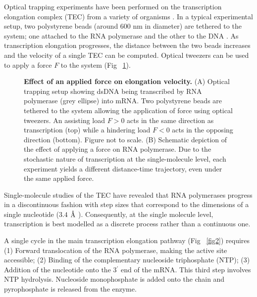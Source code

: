 \documentclass[10pt,letterpaper]{article}
\newcommand{\angstrom}{\mbox{\normalfont\AA}}
\begin{document}
Optical trapping experiments have been performed on the transcription elongation complex (TEC) from a variety of organisms \cite{abbondanzieri2005direct, adelman2002single, bai2007mechanochemical, hodges2009nucleosomal, galburt2007backtracking, skinner2004promoter, dulin2015elongation}. In a typical experimental setup, two polystyrene beads (around 600 nm in diameter) are tethered to the system; one attached to the RNA polymerase and the other to the DNA \cite{abbondanzieri2005direct}. As transcription elongation progresses, the distance between the two beads increases and the velocity of a single TEC can be computed. Optical tweezers can be used to apply a force $F$ to the system (Fig ~\ref{fig1}).  \par

\begin{figure}[!h]
\caption{\textbf{ Effect of an applied force on elongation velocity.}
(A) Optical trapping setup showing dsDNA being transcribed by RNA polymerase (grey ellipse) into mRNA. Two polystyrene beads are tethered to the system allowing the application of force using optical tweezers. An assisting load $F>0$ acts in the same direction as transcription (top) while a hindering load $F<0$ acts in the opposing direction (bottom). Figure not to scale. (B) Schematic depiction of the effect of applying a force on RNA polymerase. Due to the stochastic nature of transcription at the single-molecule level, each experiment yields a different distance-time trajectory, even under the same applied force. }
\label{fig1}
\end{figure}




Single-molecule studies of the TEC have revealed that RNA polymerases progress in a discontinuous fashion \cite{abbondanzieri2005direct, neuman2003ubiquitous, davenport2000single, tolic2004diversity, abbondanzieri2005picocalorimetry} with step sizes that correspond to the dimensions of a single nucleotide ($3.4$ $\angstrom$ \cite{watson1953molecular}). Consequently, at the single molecule level, transcription is best modelled as a discrete process rather than a continuous one.    \par



A single cycle in the main transcription elongation pathway (Fig ~\ref{fig2}) requires (1) Forward translocation of the RNA polymerase, making the active site accessible; (2) Binding of the complementary nucleoside triphosphate (NTP); (3) Addition of the nucleotide onto the 3$^\prime$ end of the mRNA. This third step involves NTP hydrolysis. Nucleoside monophosphate is added onto the chain and pyrophosphate is released from the enzyme.  \\
\end{document}
